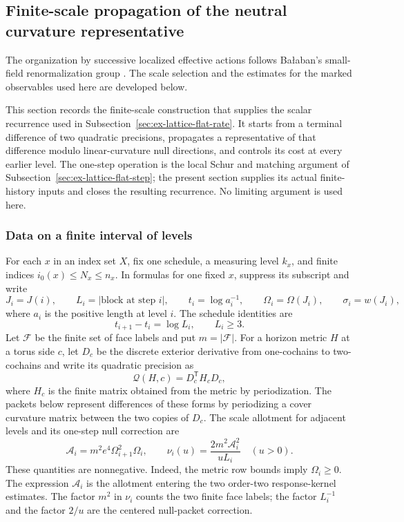 \subsection{Finite-scale propagation of the neutral curvature representative}
\label{sec:ex-lattice-rg-construction}

The organization by successive localized effective actions follows
Ba\l{}aban's small-field renormalization group
\cite[\S\S0--2]{Balaban87RG1}. The scale selection and the estimates
for the marked observables used here are developed below.


This section records the finite-scale construction that supplies the scalar
recurrence used in Subsection~\ref{sec:ex-lattice-flat-rate}. It starts from a
terminal difference of two quadratic precisions, propagates a representative
of that difference modulo linear-curvature null directions, and controls its
cost at every earlier level. The one-step operation is the local Schur and
matching argument of Subsection~\ref{sec:ex-lattice-flat-step}; the present
section supplies its actual finite-history inputs and closes the resulting
recurrence. No limiting argument is used here.

\subsubsection{Data on a finite interval of levels}

For each $x$ in an index set $X$, fix one schedule, a measuring level
$k_x$, and finite indices $i_0(x)\leq N_x\leq n_x$. In formulas for one
fixed $x$, suppress its subscript and write
\[
 J_i=J(i),\qquad L_i=|\text{block at step }i|,\qquad
 t_i=\log a_i^{-1},\qquad \Omega_i=\Omega(J_i),\qquad
 \sigma_i=w(J_i),
\]
where $a_i$ is the positive length at level $i$. The schedule identities are
\[
 t_{i+1}-t_i=\log L_i,\qquad L_i\geq3.
\]
Let $\mathcal F$ be the finite set of face labels and put $m=|\mathcal F|$.
For a horizon metric $H$ at a torus side $c$, let $D_c$ be the discrete
exterior derivative from one-cochains to two-cochains and write its
quadratic precision as
\[
 \mathscr Q(H,c)=D_c^{\mathsf T}H_cD_c,
\]
where $H_c$ is the finite matrix obtained from the metric by periodization.
The packets below represent differences of these forms by periodizing a
cover curvature matrix between the two copies of $D_c$.
The scale allotment for adjacent levels and its one-step null correction are
\begin{equation}
 \mathcal A_i=m^2e^4\Omega_{i+1}^{2}\Omega_i,
 \qquad
 \nu_i(u)=\frac{2m^2\mathcal A_i^{2}}{uL_i}\quad(u>0).
 \label{eq:ex-lattice-rg-coin}
\end{equation}
These quantities are nonnegative. Indeed, the metric row bounds imply
$\Omega_i\geq0$. The expression $\mathcal A_i$ is the
allotment entering the two order-two response-kernel estimates. The factor
$m^2$ in $\nu_i$ counts the two finite face labels; the factor $L_i^{-1}$
and the factor $2/u$ are the centered null-packet correction.

